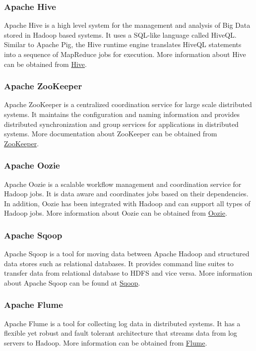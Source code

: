 \subsubsection*{Apache Hive}
Apache Hive is a high level system for the management and analysis of Big Data stored in Hadoop based systems. It uses a SQL-like language called HiveQL. Similar to Apache Pig, the Hive runtime engine translates HiveQL statements into a sequence of MapReduce jobs for execution. More information about Hive can be obtained from \href{http://hive.apache.org}{Hive}.
\subsubsection*{Apache ZooKeeper}
Apache ZooKeeper is a centralized coordination service for large scale distributed systems. It maintains the configuration and naming information and provides distributed synchronization and group services for applications in distributed systems. More documentation about ZooKeeper can be obtained from \href{http://zookeeper.apache.org}{ZooKeeper}.
\subsubsection*{Apache Oozie}
Apache Oozie is a scalable workflow management and coordination service for Hadoop jobs. It is data aware and coordinates jobs based on their dependencies. In addition, Oozie has been integrated with Hadoop and can support all types of Hadoop jobs. More information about Oozie can be obtained from \href{http://oozie.apache.org}{Oozie}.
\subsubsection*{Apache Sqoop}
Apache Sqoop is a tool for moving data between Apache Hadoop and structured data stores such as relational databases. It provides command line suites to transfer data from relational database to HDFS and vice versa. More information about Apache Sqoop can be found at \href{http://sqoop.apache.org}{Sqoop}.
\subsubsection*{Apache Flume}
Apache Flume is a tool for collecting log data in distributed systems. It has a flexible yet robust and fault tolerant architecture that streams data from log servers to Hadoop. More information can be obtained from \href{http://flume.apache.org}{Flume}.
